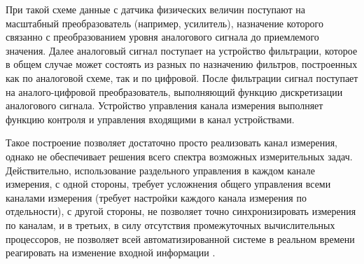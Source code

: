 \documentclass[a4paper, 14pt, titlepage]{extarticle}
\newenvironment{myfigure}[2]%
    {\pushQED{\caption{#1} \label{#2}} %
     \begin{figure}[!htb]\centering } %
    {  \popQED %
     \end{figure}}
\begin{document}
  \begin{myfigure}{Функциональная схема канала измерения}{fig:channel-scheme}
  \end{myfigure}

  При такой схеме данные с датчика физических величин поступают на масштабный преобразователь (например, усилитель),
  назначение которого связанно с преобразованием уровня аналогового сигнала до приемлемого значения.
  Далее аналоговый сигнал поступает на устройство фильтрации, которое в общем случае может состоять
  из разных по назначению фильтров, построенных как по аналоговой схеме, так и по цифровой. После
  фильтрации сигнал поступает на аналого-цифровой преобразователь, выполняющий
  функцию дискретизации аналогового сигнала. Устройство управления канала измерения
  выполняет функцию контроля и управления входящими в канал устройствами.

  Такое построение позволяет
  достаточно просто реализовать канал измерения, однако не обеспечивает решения всего спектра
  возможных измерительных задач. Действительно, использование раздельного управления в каждом канале
  измерения, с одной стороны, требует усложнения общего управления всеми каналами измерения (требует
  настройки каждого канала измерения по отдельности), с другой стороны, не позволяет точно
  синхронизировать измерения по каналам, и в третьих, в силу отсутствия промежуточных вычислительных
  процессоров, не позволяет всей автоматизированной системе в реальном времени реагировать на
  изменение входной информации \cite{stupin-methods}.
\end{document}
